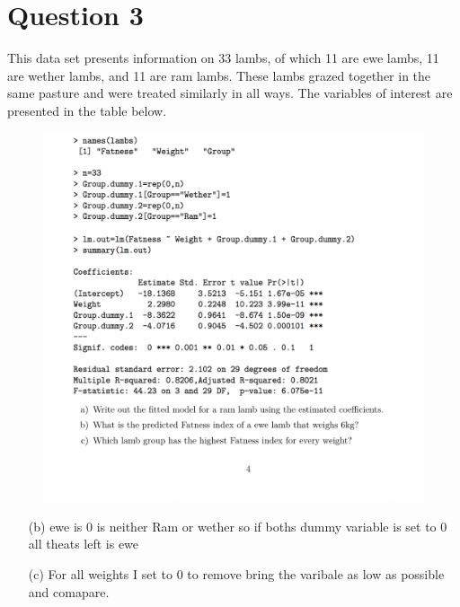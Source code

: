 \documentclass[12pt,letterpaper]{article}
\begin{document}
	\section*{Question 3}
	\vspace{.25cm}
	\noindent 	This data set presents information on 33 lambs, of which 11 are ewe lambs, 11 are wether
	lambs, and 11 are ram lambs. These lambs grazed together in the same pasture and were
	treated similarly in all ways. The variables of interest are presented in the table below.
	\begin{figure}
	\centering
	\includegraphics[width=0.7\linewidth]{Q3}
	\caption{}
	\label{fig:q3}
	\end{figure}
	
	
	
	
	\vspace{.5cm}
	
	
	\vspace{.5cm}
	\begin{enumerate}
	  
	
	
	
	
	\item [(b)] ewe is 0 is neither Ram or wether so if boths dummy variable is set to 0 all theats left is ewe
		  
	
	
	
	\vspace{2cm}
	\item [(c)] For all weights I set to 0 to remove bring the varibale as low as possible and comapare.
			  
	
	
	\end{enumerate}  
	\newpage
	
\end{document}
